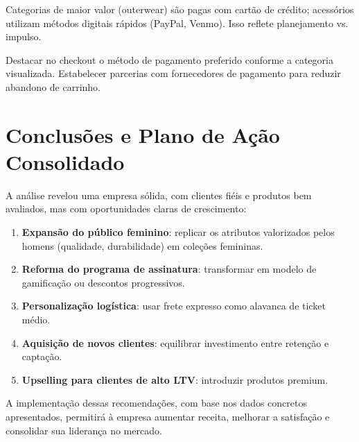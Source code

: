 \documentclass[12pt,a4paper]{article}
\begin{document}
\begin{insightbox}
Categorias de maior valor (outerwear) são pagas com cartão de crédito; acessórios utilizam métodos digitais rápidos (PayPal, Venmo). Isso reflete planejamento vs. impulso.
\end{insightbox}
\begin{actionbox}
Destacar no checkout o método de pagamento preferido conforme a categoria visualizada. Estabelecer parcerias com fornecedores de pagamento para reduzir abandono de carrinho.
\end{actionbox}

\section{Conclusões e Plano de Ação Consolidado}
A análise revelou uma empresa sólida, com clientes fiéis e produtos bem avaliados, mas com oportunidades claras de crescimento:
\begin{enumerate}
    \item \textbf{Expansão do público feminino}: replicar os atributos valorizados pelos homens (qualidade, durabilidade) em coleções femininas.
    \item \textbf{Reforma do programa de assinatura}: transformar em modelo de gamificação ou descontos progressivos.
    \item \textbf{Personalização logística}: usar frete expresso como alavanca de ticket médio.
    \item \textbf{Aquisição de novos clientes}: equilibrar investimento entre retenção e captação.
    \item \textbf{Upselling para clientes de alto LTV}: introduzir produtos premium.
\end{enumerate}
A implementação dessas recomendações, com base nos dados concretos apresentados, permitirá à empresa aumentar receita, melhorar a satisfação e consolidar sua liderança no mercado.
\end{document}
